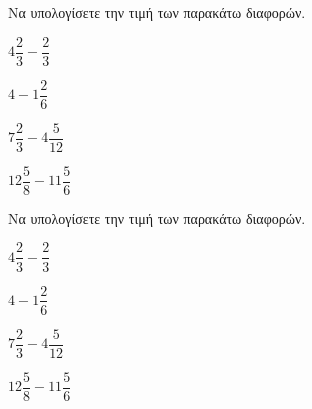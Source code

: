 Να υπολογίσετε την τιμή των παρακάτω διαφορών.
\begin{multicols}{2}
\begin{rlist}
\item $ 4\dfrac{2}{3}-\dfrac{2}{3} $
\item $ 4-1\dfrac{2}{6} $
\item $ 7\dfrac{2}{3}-4\dfrac{5}{12} $
\item $ 12\dfrac{5}{8}-11\dfrac{5}{6} $
\end{rlist}
\end{multicols}
Να υπολογίσετε την τιμή των παρακάτω διαφορών.
\begin{multicols}{2}
\begin{rlist}
\item $ 4\dfrac{2}{3}-\dfrac{2}{3} $
\item $ 4-1\dfrac{2}{6} $
\item $ 7\dfrac{2}{3}-4\dfrac{5}{12} $
\item $ 12\dfrac{5}{8}-11\dfrac{5}{6} $
\end{rlist}
\end{multicols}
